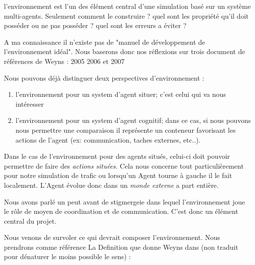 \documentclass[a4paper,11pt]{article}
\begin{document}
l'environnement est l'un des élément central d'une simulation basé sur un système multi-agents. Seulement comment le construire ? quel sont les propriété qu'il doit posséder ou ne pas posséder ? quel sont les erreurs a éviter ? 

A ma connaissance il n'existe pas de "manuel de développement de l'environnement idéal". Nous baserons donc nos réflexions sur trois document de références de Weyns : 2005\cite{Weyns05environmentfor} 2006\cite{conf/e4mas/WeynsH06} et 2007\cite{env-jaamas14} 

Nous pouvons déjà distinguer deux perspectives d'environnement :
\begin{enumerate}[label=-]
\vspace{-0.25cm}
\item l'environnement pour un system d'agent situer; c'est celui qui va nous intéresser
\vspace{-0.25cm}
\item l'environnement pour un system d'agent cognitif; dans ce cas, si nous pouvons nous permettre une comparaison il représente un conteneur favorisant les actions de l'agent (ex: communication, taches externes, etc..).
\vspace{-0.25cm}
\end{enumerate} 

Dans le cas de l'environnement pour des agents situés, celui-ci doit pouvoir permettre de faire des \textit{actions situées}. Cela nous concerne tout particulièrement pour notre simulation de trafic ou lorsqu'un Agent tourne à gauche il le fait localement. L'Agent évolue donc dans un \textit{monde externe} a part entière.

Nous avons parlé un peut avant de stigmergeie dans lequel l'environnement joue le rôle de moyen de coordination et de communication. C'est donc un élément central du projet. 

Nous venons de survoler ce qui devrait composer l'environnement. Nous prendrons comme référence La Definition que donne Weyns dans \cite{conf/e4mas/WeynsH06} (non traduit pour dénaturer le moins possible le sens) :
\\

\\ 

\vspace{0.25cm}
\end{document}
